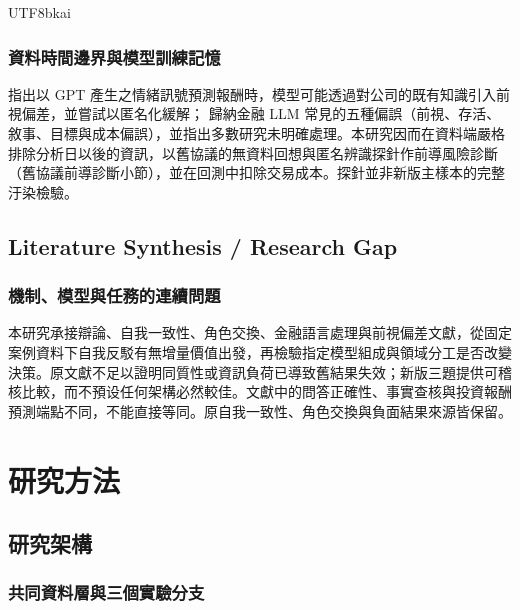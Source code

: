 \documentclass[12pt,a4paper]{article}
\begin{document}
\begin{CJK}{UTF8}{bkai}
\subsubsection{資料時間邊界與模型訓練記憶}
\citet{glasserman2023lookahead} 指出以 GPT 產生之情緒訊號預測報酬時，模型可能透過對公司的既有知識引入前視偏差，並嘗試以匿名化緩解；\citet{kong2026bias} 歸納金融 LLM 常見的五種偏誤（前視、存活、敘事、目標與成本偏誤），並指出多數研究未明確處理。本研究因而在資料端嚴格排除分析日以後的資訊，以舊協議的無資料回想與匿名辨識探針作前導風險診斷（舊協議前導診斷小節），並在回測中扣除交易成本。探針並非新版主樣本的完整汙染檢驗。
\subsection{Literature Synthesis / Research Gap}

\subsubsection{機制、模型與任務的連續問題}

本研究承接辯論、自我一致性、角色交換、金融語言處理與前視偏差文獻，從固定案例資料下自我反駁有無增量價值出發，再檢驗指定模型組成與領域分工是否改變決策。原文獻不足以證明同質性或資訊負荷已導致舊結果失效；新版三題提供可稽核比較，而不預设任何架構必然較佳。文獻中的問答正確性、事實查核與投資報酬預測端點不同，不能直接等同。原自我一致性、角色交換與負面結果來源皆保留。

\section{研究方法}

\subsection{研究架構}

\subsubsection{共同資料層與三個實驗分支}


\end{CJK}
\end{document}

